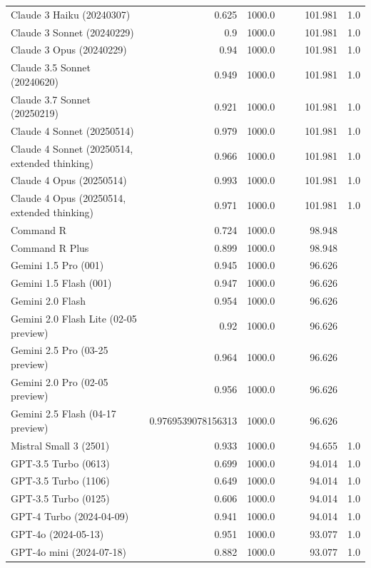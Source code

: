 \begin{table}[htp]
{\begin{tabular}{lrrrrrr}
Claude 3 Haiku (20240307) & 0.625 & 1000.0 &  &  & 101.981 & 1.0 \\
Claude 3 Sonnet (20240229) & 0.9 & 1000.0 &  &  & 101.981 & 1.0 \\
Claude 3 Opus (20240229) & 0.94 & 1000.0 &  &  & 101.981 & 1.0 \\
Claude 3.5 Sonnet (20240620) & 0.949 & 1000.0 &  &  & 101.981 & 1.0 \\
Claude 3.7 Sonnet (20250219) & 0.921 & 1000.0 &  &  & 101.981 & 1.0 \\
Claude 4 Sonnet (20250514) & 0.979 & 1000.0 &  &  & 101.981 & 1.0 \\
Claude 4 Sonnet (20250514, extended thinking) & 0.966 & 1000.0 &  &  & 101.981 & 1.0 \\
Claude 4 Opus (20250514) & 0.993 & 1000.0 &  &  & 101.981 & 1.0 \\
Claude 4 Opus (20250514, extended thinking) & 0.971 & 1000.0 &  &  & 101.981 & 1.0 \\
Command R & 0.724 & 1000.0 &  &  & 98.948 &  \\
Command R Plus & 0.899 & 1000.0 &  &  & 98.948 &  \\
Gemini 1.5 Pro (001) & 0.945 & 1000.0 &  &  & 96.626 &  \\
Gemini 1.5 Flash (001) & 0.947 & 1000.0 &  &  & 96.626 &  \\
Gemini 2.0 Flash & 0.954 & 1000.0 &  &  & 96.626 &  \\
Gemini 2.0 Flash Lite (02-05 preview) & 0.92 & 1000.0 &  &  & 96.626 &  \\
Gemini 2.5 Pro (03-25 preview) & 0.964 & 1000.0 &  &  & 96.626 &  \\
Gemini 2.0 Pro (02-05 preview) & 0.956 & 1000.0 &  &  & 96.626 &  \\
Gemini 2.5 Flash (04-17 preview) & 0.9769539078156313 & 1000.0 &  &  & 96.626 &  \\
Mistral Small 3 (2501) & 0.933 & 1000.0 &  &  & 94.655 & 1.0 \\
GPT-3.5 Turbo (0613) & 0.699 & 1000.0 &  &  & 94.014 & 1.0 \\
GPT-3.5 Turbo (1106) & 0.649 & 1000.0 &  &  & 94.014 & 1.0 \\
GPT-3.5 Turbo (0125) & 0.606 & 1000.0 &  &  & 94.014 & 1.0 \\
GPT-4 Turbo (2024-04-09) & 0.941 & 1000.0 &  &  & 94.014 & 1.0 \\
GPT-4o (2024-05-13) & 0.951 & 1000.0 &  &  & 93.077 & 1.0 \\
GPT-4o mini (2024-07-18) & 0.882 & 1000.0 &  &  & 93.077 & 1.0 \\

\end{tabular}}
\end{table}
